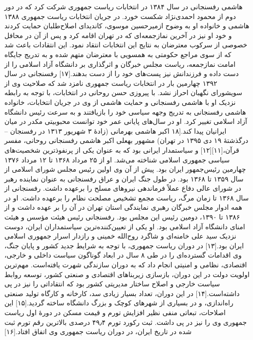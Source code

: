 هاشمی رفسنجانی در سال ۱۳۸۴ در انتخابات ریاست جمهوری شرکت کرد که در دور دوم از محمود احمدی‌نژاد شکست خورد. در جریان انتخابات ریاست جمهوری ۱۳۸۸ هاشمی و خانواده او به وضوح ازمیرحسین موسوی، کاندیدای اصلاح‌طلبان حمایت کردند و خود او نیز در آخرین نمازجمعه‌ای که در تهران اقامه کرد و پس از آن در محافل خصوصی از سرکوب معترضان به نتایج این انتخابات انتقاد نمود. این انتقادات باعث شد که از سوی مراجع حکومتی به همسویی با معترضان متهم شده و به تدریج جایگاه امامت نمازجمعه، ریاست مجلس خبرگان و اثرگذاری بر دانشگاه آزاد اسلامی را از دست داده و فرزندانش نیز پست‌های خود را از دست بدهند.[۱۷]
رفسنجانی در سال ۱۳۹۲ چهارمین بار در انتخابات ریاست جمهوری نامزد شد که صلاحیت وی از سویشورای نگهبان احراز نشد. با پیروزی حسن روحانی در انتخابات، با توجه به رابطه نزدیک او با هاشمی رفسنجانی و حمایت هاشمی از وی در جریان انتخابات، خانواده هاشمی رفسنجانی به تدریج وجهه سیاسی خود را بازیافتند و به سرعت رئیس دانشگاه آزاد اسلامی تغییر کرد. او در سال‌های پایانی عمر خود توانست محبوبیتی مکدر در میان ایرانیان پیدا کند.[۱۸
اکبر هاشمی بهرمانی (زادهٔ ۳ شهریور ۱۳۱۳ در رفسنجان – درگذشتهٔ ۱۹ دی ۱۳۹۵ در تهران) مشهور بهعلی اکبر هاشمی رفسنجانی روحانی، مفسر قرآن،[۱۱][۱۲] و سیاستمدار ایرانی بود که به عنوان یکی از پرنفوذترین شخصیت‌های سیاسی جمهوری اسلامی شناخته می‌شد. او از ۲۵ مرداد ۱۳۶۸ تا ۱۲ مرداد ۱۳۷۶ چهارمین رئیس‌جمهور ایران بود. پیش از آن وی اولین رئیس مجلس شورای اسلامی از سال ۱۳۵۹ تا ۱۳۶۸ بود. در طول جنگ ایران و عراق رفسنجانی به عنوان نماینده رهبر در شورای عالی دفاع عملاً فرماندهی نیروهای مسلح را برعهده داشت. رفسنجانی از سال ۱۳۶۸ تا زمان مرگ، ریاست مجمع تشخیص مصلحت نظام را برعهده داشت. او در همه ادوار مجلس خبرگان رهبری نمایندگی استان تهران در آن را بر عهده داشت و از ۱۳۸۶ تا ۱۳۹۰، دومین رئیس این مجلس بود. رفسنجانی رئیس هیئت مؤسس و هیئت امنای دانشگاه آزاد اسلامی بود.
او یکی از تعیین‌کننده‌ترین سیاستمداران ایران، دوست نزدیک سید علی خامنه‌ای و شاگرد روح‌الله خمینی و رازدار اسرار جمهوری اسلامی ایران بود.[۱۳] در دوران ریاست جمهوری، با توجه به شرایط جدید کشور و پایان جنگ، وی اقدامات گسترده‌ای را در طی ۸ سال در ابعاد گوناگون سیاست داخلی و خارجی، اقتصادی، نظامی و امنیتی انجام داد که به دوران سازندگی شهرت یافته‌است. مهم‌ترین اولویت دولت در این دوران، بازسازی زیربناهای اقتصادی و صنعتی کشور، توسعه روابط سیاست خارجی و اصلاح ساختار مدیریتی کشور بود که انتقاداتی را نیز در پی داشته‌است.[۱۴] در این دوران، تعداد بسیار زیادی سد، کارخانه و کارگاه تولید صنعتی راه‌اندازی، و در بسیاری از شهرهای کوچک و بزرگ دانشگاه ساخته گردید.[۱۵] این اصلاحات، تبعاتی منفی نظیر افزایش تورم و قیمت مسکن در دورهٔ اول ریاست جمهوری وی را نیز در پی داشت. ثبت رکورد تورم ۴۹٫۴ درصدی بالاترین رقم تورم ثبت شده در تاریخ ایران، در دوران ریاست جمهوری وی اتفاق افتاد.[۱۶]
